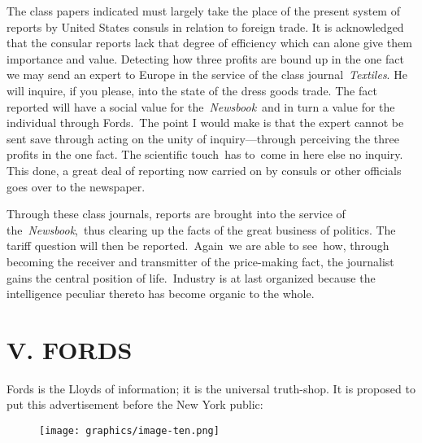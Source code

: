 \documentclass[openany,nobib]{tufte-book}
\begin{document}
The class papers indicated must largely take the place of the present
system of reports by United States consuls in relation to foreign trade.
It is acknowledged that the consular reports lack that degree of
efficiency which can alone give them importance and value. Detecting how
three profits are bound up in the one fact we may send an expert to
Europe in the service of the class journal~\emph{Textiles}. He will
inquire, if you please, into the state of the dress goods trade. The
fact reported will have a social value for the~\emph{Newsbook}~and in
turn a value for the individual through Fords.~The point I would make is
that the expert cannot be sent save through acting on the unity of
inquiry---through perceiving the three profits in the one fact. The
scientific touch~has to~come in here else no inquiry. This done, a great
deal of reporting now carried on by consuls or other officials goes over
to the newspaper.~

\enlargethispage{\baselineskip}

Through these class journals, reports are brought into the service of
the~\emph{Newsbook},~thus clearing up the facts of the great business of
politics. The tariff question will then be reported.~Again~we are able
to see~how, through becoming the receiver and transmitter of the
price-making fact, the journalist gains the central position of
life.~Industry is at last organized because the intelligence peculiar
thereto has become organic to the whole.~~

\newpage\hypertarget{v-fords}{%
\section{V. FORDS~}\label{v-fords}}

Fords is the Lloyds of information; it is the universal truth-shop.
It is proposed to put this advertisement before the New York public:
\begin{figure}
   \texttt{[image: graphics/image-ten.png]}
   \label{fig:fig10}
\end{figure}
\end{document}
